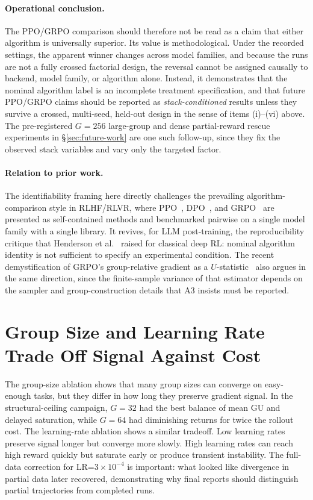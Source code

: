 \documentclass[12pt,a4paper]{report}
\begin{document}
\paragraph{Operational conclusion.}
The PPO/GRPO comparison should therefore not be read as a claim that either algorithm is universally superior. Its value is methodological. Under the recorded settings, the apparent winner changes across model families, and because the runs are not a fully crossed factorial design, the reversal cannot be assigned causally to backend, model family, or algorithm alone. Instead, it demonstrates that the nominal algorithm label is an incomplete treatment specification, and that future PPO/GRPO claims should be reported as \emph{stack-conditioned} results unless they survive a crossed, multi-seed, held-out design in the sense of items (i)--(vi) above. The pre-registered $G\!=\!256$ large-group and dense partial-reward rescue experiments in \S\ref{sec:future-work} are one such follow-up, since they fix the observed stack variables and vary only the targeted factor.

\paragraph{Relation to prior work.}
The identifiability framing here directly challenges the prevailing algorithm-comparison style in RLHF/RLVR, where PPO~\citep{schulman2017ppo}, DPO~\citep{rafailov2023dpo}, and GRPO~\citep{shao2024deepseekmath} are presented as self-contained methods and benchmarked pairwise on a single model family with a single library. It revives, for LLM post-training, the reproducibility critique that Henderson et al.~\citep{henderson2018deep} raised for classical deep RL: nominal algorithm identity is not sufficient to specify an experimental condition. The recent demystification of GRPO's group-relative gradient as a $U$-statistic~\citep{zhou2026demystify} also argues in the same direction, since the finite-sample variance of that estimator depends on the sampler and group-construction details that A3 insists must be reported.

\section{Group Size and Learning Rate Trade Off Signal Against Cost}
\label{sec:g-lr}

The group-size ablation shows that many group sizes can converge on easy-enough tasks, but they differ in how long they preserve gradient signal. In the structural-ceiling campaign, $G=32$ had the best balance of mean GU and delayed saturation, while $G=64$ had diminishing returns for twice the rollout cost. The learning-rate ablation shows a similar tradeoff. Low learning rates preserve signal longer but converge more slowly. High learning rates can reach high reward quickly but saturate early or produce transient instability. The full-data correction for LR=$3\times 10^{-4}$ is important: what looked like divergence in partial data later recovered, demonstrating why final reports should distinguish partial trajectories from completed runs.
\end{document}

